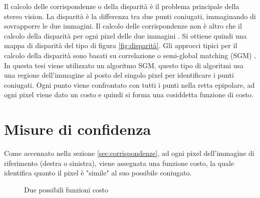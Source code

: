 \documentclass[12pt]{report}
\newcommand{\nullpage}{\newpage\null\thispagestyle{empty}}  %
\begin{document}
			Il calcolo delle corrispondenze o della disparità è il problema principale della stereo vision. \newline
			La disparità è la differenza tra due punti coniugati, immaginando di sovrapporre le due immagini. Il calcolo delle corrispondenze non è altro che il calcolo della disparità per ogni pixel delle due immagini \cite{fusiello}. Si ottiene quindi una mappa di disparità del tipo di figura \ref{fig:disparità}.\newline
			Gli approcci tipici per il calcolo della disparità sono basati su correlazione \cite{correlation} o semi-global matching (SGM) \cite{SGM}. In questa tesi viene utilizzato un algoritmo SGM, questo tipo di algoritmi usa una regione dell'immagine al posto del singolo pixel per identificare i punti coniugati. Ogni punto viene confrontato con tutti i punti nella retta epipolare, ad ogni pixel viene dato un costo e quindi si forma una cosiddetta funzione di costo.
			

			



	\nullpage
	
	\chapter{Misure di confidenza}
	\label{sec:confidenza}
	\pagestyle{fancy}
	
		Come accennato nella sezione \ref{sec:corrispondenze}, ad ogni pixel dell'immagine di riferimento (destra o sinistra), viene assegnata una funzione costo, la quale identifica quanto il pixel è "simile" al suo possibile coniugato.
			
			
		\begin{figure}[<h>]
			\centering
			 \quad
			\caption{Due possibili funzioni costo}
			\label{fig:costi}
		\end{figure}	
		
\end{document}
